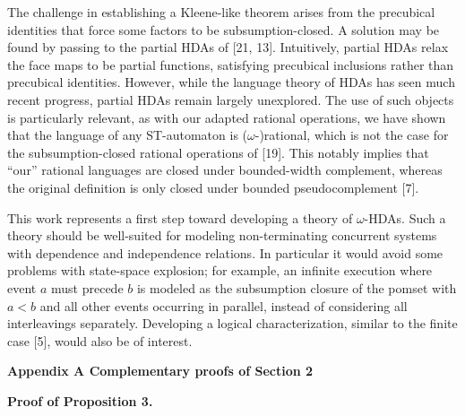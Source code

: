  
 
The challenge in establishing a Kleene-like theorem arises from the precubical identities that force some factors to be subsumption-closed. A solution may be found by passing to the partial HDAs of [21, 13]. Intuitively, partial HDAs relax the face maps to be partial functions, satisfying precubical inclusions rather than precubical identities. However, while the language theory of HDAs has seen much recent progress, partial HDAs remain largely unexplored. The use of such objects is particularly relevant, as with our adapted rational operations, we have shown that the language of any ST-automaton is ($\omega$-)rational, which is not the case for the subsumption-closed rational operations of [19]. This notably implies that “our” rational languages are closed under bounded-width complement, whereas the original definition is only closed under bounded pseudocomplement [7].\par
 
 
 
This work represents a first step toward developing a theory of $\omega$-HDAs. Such a theory should be well-suited for modeling non-terminating concurrent systems with dependence and independence relations. In particular it would avoid some problems with state-space explosion; for example, an infinite execution where event $a$ must precede $b$ is modeled as the subsumption closure of the pomset with $a<b$ and all other events occurring in parallel, instead of considering all interleavings separately. Developing a logical characterization, similar to the finite case [5], would also be of interest.\par
 
  


 
\par\medskip\noindent\textbf{Appendix A Complementary proofs of Section 2}\par
 
 
\par\medskip\noindent\textbf{Proof of Proposition 3.}\par
 
 

